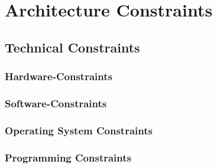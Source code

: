 \section{Architecture Constraints}




\subsection{Technical Constraints}


\subsubsection{Hardware-Constraints}


\subsubsection{Software-Constraints}


\subsubsection{Operating System Constraints}


\subsubsection{Programming Constraints}

